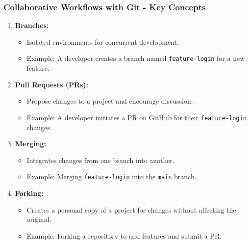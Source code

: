 \documentclass{beamer}
\begin{document}
\begin{frame}[fragile]
    \frametitle{Collaborative Workflows with Git - Key Concepts}
    \begin{enumerate}
        \item \textbf{Branches:}
        \begin{itemize}
            \item Isolated environments for concurrent development.
            \item Example: A developer creates a branch named \texttt{feature-login} for a new feature.
        \end{itemize}

        \item \textbf{Pull Requests (PRs):}
        \begin{itemize}
            \item Propose changes to a project and encourage discussion.
            \item Example: A developer initiates a PR on GitHub for their \texttt{feature-login} changes.
        \end{itemize}

        \item \textbf{Merging:}
        \begin{itemize}
            \item Integrates changes from one branch into another.
            \item Example: Merging \texttt{feature-login} into the \texttt{main} branch.
        \end{itemize}
        
        \item \textbf{Forking:}
        \begin{itemize}
            \item Creates a personal copy of a project for changes without affecting the original.
            \item Example: Forking a repository to add features and submit a PR.
        \end{itemize}
    \end{enumerate}
\end{frame}
\end{document}
